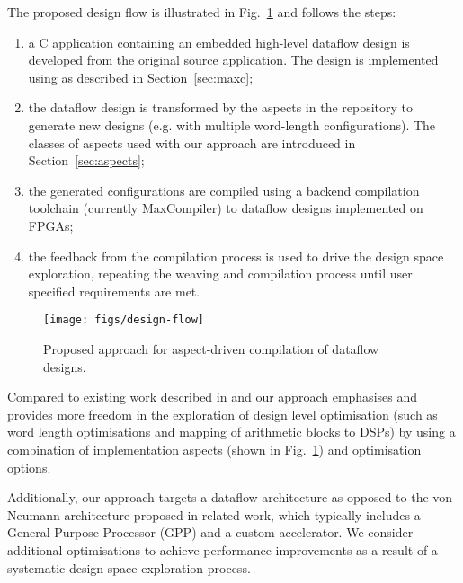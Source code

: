 The proposed design flow is illustrated in Fig.~\ref{fig:design-flow}
and follows the steps:
\begin{enumerate}
\item a C application containing an embedded high-level dataflow
  design is developed from the original source application. The design
  is implemented using \FAST{} as described in Section~\ref{sec:maxc};
\item the dataflow design is transformed by the aspects in the
  repository to generate new designs (e.g. with multiple word-length
  configurations). The classes of aspects used with our approach are
  introduced in Section~\ref{sec:aspects};
\item the generated configurations are compiled using a backend
  compilation toolchain (currently MaxCompiler) to dataflow designs
  implemented on FPGAs;
\item the feedback from the compilation process is used to drive the
  design space exploration, repeating the weaving and compilation
  process until user specified requirements are met.
\end{enumerate}

\begin{figure}[!h]
  \texttt{[image: figs/design-flow]}
  \caption{Proposed approach for aspect-driven compilation of dataflow
    designs.}
  \label{fig:design-flow}
\end{figure}

Compared to existing work described in
\cite{Cardoso:Teixeira:Alves:Nobre:Diniz:Cutinho:Luk:2012} and
\cite{cardoso2011new} our approach emphasises and provides more
freedom in the exploration of design level optimisation (such as word
length optimisations and mapping of arithmetic blocks to DSPs) by
using a combination of implementation aspects (shown in
Fig.~\ref{fig:design-flow}) and \FAST{} optimisation options.

Additionally, our approach targets a dataflow architecture as opposed
to the von Neumann architecture proposed in related work, which
typically includes a General-Purpose Processor (GPP) and a custom
accelerator. We consider additional optimisations to achieve
performance improvements as a result of a systematic design space
exploration process.
